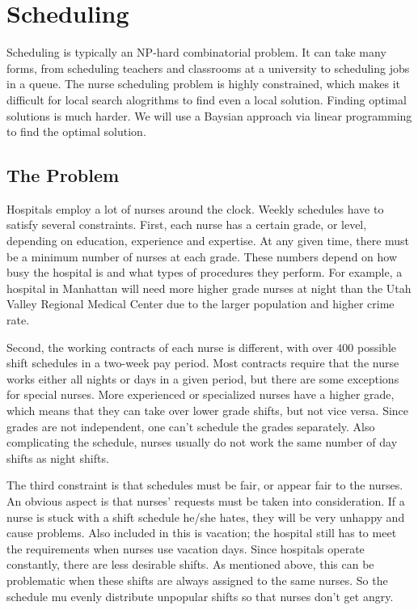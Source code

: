 \label{lab:Scheduling}


\section*{Scheduling}

Scheduling is typically an NP-hard combinatorial problem.  It can take many forms, from scheduling teachers and classrooms at a university to scheduling jobs in a queue. The nurse scheduling problem is highly constrained, which makes it difficult for local search alogrithms to find even a local solution. Finding optimal solutions is much harder. We will use a Baysian approach via linear programming to find the optimal solution.


\subsection*{The Problem}
Hospitals employ a lot of nurses around the clock. Weekly schedules have to satisfy several constraints. First, each nurse has a certain grade, or level, depending on education, experience and expertise. At any given time, there must be a minimum number of nurses at each grade. These numbers depend on how busy the hospital is and what types of procedures they perform.  For example, a hospital in Manhattan will need more higher grade nurses at night than the Utah Valley Regional Medical Center due to the larger population and higher crime rate. 

Second, the working contracts of each nurse is different, with over $400$ possible shift schedules in a two-week pay period. Most contracts require that the nurse works either all nights or days in a given period, but there are some exceptions for special nurses. More experienced or specialized nurses have a higher grade, which means that they can take over lower grade shifts, but not vice versa. Since grades are not independent, one can't schedule the grades separately. Also complicating the schedule, nurses usually do not work the same number of day shifts as night shifts.  

The third constraint is that schedules must be fair, or appear fair to the nurses. An obvious aspect is that nurses' requests must be taken into consideration. If a nurse is stuck with a shift schedule he/she hates, they will be very unhappy and cause problems. Also included in this is vacation; the hospital still has to meet the requirements when nurses use vacation days. Since hospitals operate constantly, there are less desirable shifts.  As mentioned above, this can be problematic when these shifts are always assigned to the same nurses. So the schedule mu evenly distribute unpopular shifts so that nurses don't get angry. 

